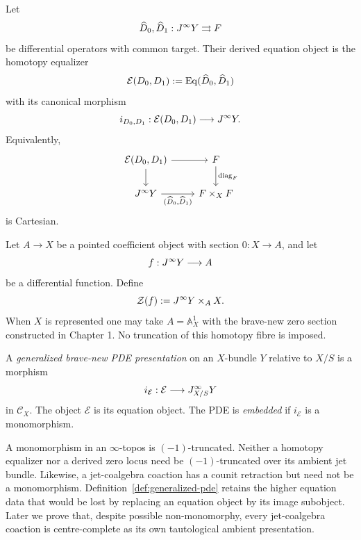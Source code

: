 \begin{construction}
\label{con:equation-locus}
Let
\[
    \widehat D_0,\widehat D_1:J^{\infty} Y\rightrightarrows F
\]
be differential operators with common target.  Their derived equation object is the homotopy equalizer
\[
    \mathcal E(D_0,D_1):=\operatorname{Eq}(\widehat D_0,\widehat D_1)
\]
with its canonical morphism
\[
    i_{D_0,D_1}:\mathcal E(D_0,D_1)\longrightarrow J^{\infty} Y.
\]
Equivalently,
\[
\begin{tikzcd}
\mathcal E(D_0,D_1)
  \arrow[r]
  \arrow[d]
& F \arrow[d,"\operatorname{diag}_F"]
\\
\Jinf Y \arrow[r,"{(\widehat D_0,\widehat D_1)}"'] & F\times_XF
\end{tikzcd}
\]
is Cartesian.
\end{construction}

\begin{construction}
\label{con:scalar-equation}
Let $A\to X$ be a pointed coefficient object with section $0:X\to A$, and let
\[
    f:J^{\infty} Y\longrightarrow A
\]
be a differential function.  Define
\[
    \mathcal Z(f):=J^{\infty} Y\times_A X.
\]
When $X$ is represented one may take $A=\mathbb A^1_X$ with the brave-new zero section constructed in Chapter 1.  No truncation of this homotopy fibre is imposed.
\end{construction}

\begin{definition}
\label{def:generalized-pde}
A \emph{generalized brave-new PDE presentation} on an $X$-bundle $Y$ relative to $X/S$ is a morphism
\[
    i_{\mathcal E}:\mathcal E\longrightarrow J^{\infty}_{X/S}Y
\]
in $\mathcal C_X$.  The object $\mathcal E$ is its equation object.  The PDE is \emph{embedded} if $i_{\mathcal E}$ is a monomorphism.
\end{definition}

\begin{remark}
A monomorphism in an $\infty$-topos is $(-1)$-truncated.  Neither a homotopy equalizer nor a derived zero locus need be $(-1)$-truncated over its ambient jet bundle.  Likewise, a jet-coalgebra coaction has a counit retraction but need not be a monomorphism.  Definition~\ref{def:generalized-pde} retains the higher equation data that would be lost by replacing an equation object by its image subobject.  Later we prove that, despite possible non-monomorphy, every jet-coalgebra coaction is centre-complete as its own tautological ambient presentation.
\end{remark}

